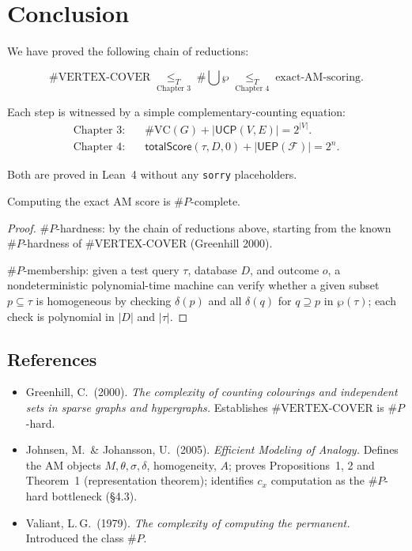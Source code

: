 \chapter{Conclusion}

We have proved the following chain of reductions:

\[
  \#\text{VERTEX-COVER}
  \;\underset{\text{Chapter 3}}{\leq_T}\;
  \#\bigcup\wp
  \;\underset{\text{Chapter 4}}{\leq_T}\;
  \text{exact-AM-scoring}.
\]

Each step is witnessed by a simple complementary-counting equation:
\begin{align*}
  \text{Chapter 3:} &\quad \#\text{VC}(G) + |\mathsf{UCP}(V,E)| = 2^{|V|}. \\
  \text{Chapter 4:} &\quad \mathsf{totalScore}(\tau, D, 0) + |\mathsf{UEP}(\mathcal{F})| = 2^n.
\end{align*}

Both are proved in Lean~4 without any \texttt{sorry} placeholders.

\begin{corollary}
  \label{cor:am-hard}
  Computing the exact AM score is $\#P$-complete.

  \begin{proof}
    $\#P$-hardness: by the chain of reductions above, starting from the known
    $\#P$-hardness of $\#\text{VERTEX-COVER}$ (Greenhill 2000).

    $\#P$-membership: given a test query $\tau$, database $D$, and outcome $o$,
    a nondeterministic polynomial-time machine can verify whether a given subset
    $p \subseteq \tau$ is homogeneous by checking $\delta(p)$ and all
    $\delta(q)$ for $q \supseteq p$ in $\wp(\tau)$; each check is polynomial in
    $|D|$ and $|\tau|$.
  \end{proof}
\end{corollary}

\section*{References}

\begin{itemize}
  \item Greenhill, C.\ (2000).
    \textit{The complexity of counting colourings and independent sets in sparse
    graphs and hypergraphs.}
    Establishes $\#\text{VERTEX-COVER}$ is $\#P$-hard.

  \item Johnsen, M.\ \& Johansson, U.\ (2005).
    \textit{Efficient Modeling of Analogy.}
    Defines the AM objects $M, \theta, \sigma, \delta$, homogeneity, $A$;
    proves Propositions~1, 2 and Theorem~1 (representation theorem);
    identifies $c_x$ computation as the $\#P$-hard bottleneck (§4.3).

  \item Valiant, L.\,G.\ (1979).
    \textit{The complexity of computing the permanent.}
    Introduced the class $\#P$.
\end{itemize}
